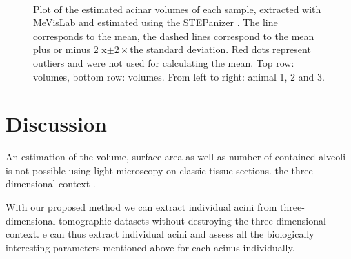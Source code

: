 \documentclass[final,paper=a4,DIV=calc,abstract,english]{scrartcl}
\newcommand{\imsize}{\linewidth}
\newcommand{\biggerthan}{2\xspace} %
\begin{document}
\renewcommand{\imsize}{0.35\textwidth}
\begin{figure}[htb]
	\centering
	\subfloat{
		}\hfill%
	\subfloat{
		
		}\hfill%
	\subfloat{
		
		}\\%
	\subfloat{
		
		}\hfill%
	\subfloat{
		
		}\hfill%
	\subfloat{
		
		}%
	\caption{Plot of the estimated acinar volumes of each sample, extracted with MeVisLab  and estimated using the STEPanizer .
		The line corresponds to the mean, the dashed lines correspond to the mean \ifJCS plus or minus \biggerthan x\xspace\else\(\pm\biggerthan\times\)\xspace\fi the standard deviation.
		Red dots represent outliers and were not used for calculating the mean.
		Top row:  volumes, bottom row:  volumes.
		From left to right: animal 1, 2 and 3.}
	\label{fig:Volume plots}
\end{figure}

\section{Discussion}\label{sec:discussion}

An estimation of the volume,  surface area as well as  number of contained alveoli   is not possible using light microscopy on classic tissue sections.
 the three-dimensional context .

With our proposed method we can extract individual acini from three-dimensional tomographic datasets without destroying the three-dimensional context.
e can thus extract individual acini and assess all the biologically interesting parameters mentioned above for each acinus individually.
\end{document}
